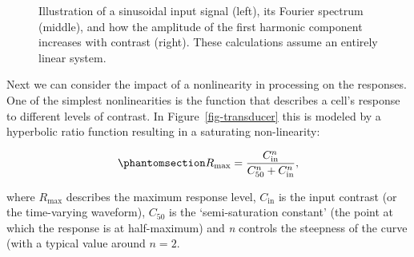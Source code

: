 \documentclass[
  letterpaper,
  DIV=11,
  numbers=noendperiod]{scrartcl}
\begin{document}
\begin{figure}


\caption{\label{fig-linear}Illustration of a sinusoidal input signal
(left), its Fourier spectrum (middle), and how the amplitude of the
first harmonic component increases with contrast (right). These
calculations assume an entirely linear system.}

\end{figure}%

Next we can consider the impact of a nonlinearity in processing on the
responses. One of the simplest nonlinearities is the function that
describes a cell's response to different levels of contrast. In
Figure~\ref{fig-transducer} this is modeled by a hyperbolic ratio
function resulting in a saturating non-linearity:

\begin{equation}\phantomsection\label{eq-nakarushton}{R_{\mathrm{max}} = \frac{C_{\mathrm{in}}^n}{C_{50}^n + C_{\mathrm{in}}^n},}\end{equation}

where \({R_{\mathrm{max}}}\) describes the maximum response level,
\(C_{\mathrm{in}}\) is the input contrast (or the time-varying
waveform), \(C_{50}\) is the `semi-saturation constant' (the point at
which the response is at half-maximum) and \emph{n} controls the
steepness of the curve (with a typical value around \(n=2\).
\end{document}

